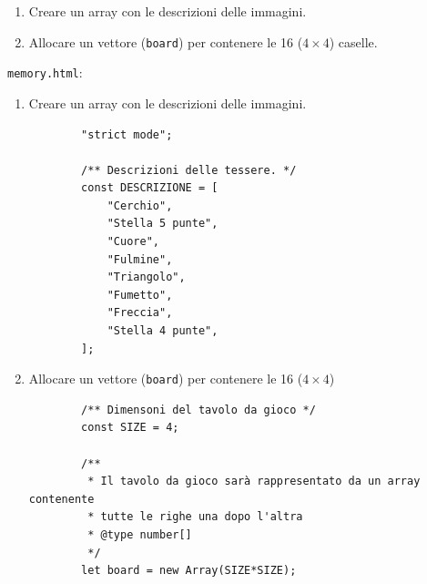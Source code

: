 \begin{frame}\transfade
  \begin{exercise}\centering
    \begin{enumerate}
      \item Creare un array con le descrizioni delle immagini.
      \item Allocare un vettore (\texttt{board}) per contenere le 16 ($4\times4$) caselle.
    \end{enumerate}
  \end{exercise}
\end{frame}

\begin{frame}[fragile]\transfade
  \begin{sol}\centering
    \texttt{memory.html}:
    \begin{enumerate}
      \item Creare un array con le descrizioni delle immagini.
      \begin{verbatim}
        "strict mode";

        /** Descrizioni delle tessere. */
        const DESCRIZIONE = [
            "Cerchio",
            "Stella 5 punte",
            "Cuore",
            "Fulmine",
            "Triangolo",
            "Fumetto",
            "Freccia",
            "Stella 4 punte",
        ];
      \end{verbatim}
    \end{enumerate}
  \end{sol}
\end{frame}
\begin{frame}[fragile]\transfade
  \begin{sol}\centering
    \begin{enumerate}
    \setcounter{enumi}{1}
      \item Allocare un vettore (\texttt{board}) per contenere le 16 ($4\times4$)
      \begin{verbatim}
        /** Dimensoni del tavolo da gioco */
        const SIZE = 4;

        /**
         * Il tavolo da gioco sarà rappresentato da un array contenente
         * tutte le righe una dopo l'altra
         * @type number[]
         */
        let board = new Array(SIZE*SIZE);
      \end{verbatim}
    \end{enumerate}
  \end{sol}
\end{frame}